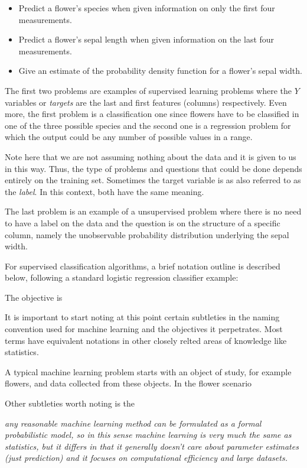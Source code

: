 \begin{itemize}
	\item Predict a flower's species when given information on only the first four measurements.
	\item Predict a flower's sepal length when given information on the last four measurements.
	\item Give an estimate of the probability density function for a flower's sepal width.
\end{itemize}

The first two problems are examples of supervised learning problems where the $Y$ variables or \textit{targets} are the last and first features (columns) respectively. Even more, the first problem is a classification one since flowers have to be classified in one of the three possible species and the second one is a regression problem for which the output could be any number of possible values in a range.

Note here that we are not assuming nothing about the data and it is given to us in this way. Thus, the type of problems and questions that could be done depends entirely on the training set. Sometimes the target variable is as also referred to as the \textit{label}. In this context, both have the same meaning.

The last problem is an example of a unsupervised problem where there is no need to have a label on the data and the question is on the structure of a specific column, namely the unobservable probability distribution underlying the sepal width.



For supervised classification algorithms, a brief notation outline is described below, following a standard logistic regression classifier example:


The objective is


It is important to start noting at this point certain subtleties in the naming convention used for machine learning and the objectives it perpetrates. Most terms have equivalent notations in other closely relted areas of knowledge like statistics. 

A typical machine learning problem starts with an object of study, for example flowers, and data collected from these objects. In the flower scenario 

Other subtleties worth noting is the 

\textit{any reasonable machine learning method can be formulated as a formal probabilistic model, so in this sense machine learning is very much the same as statistics, but it differs in that it generally doesn't care about parameter estimates (just prediction) and it focuses on computational efficiency and large datasets.}

